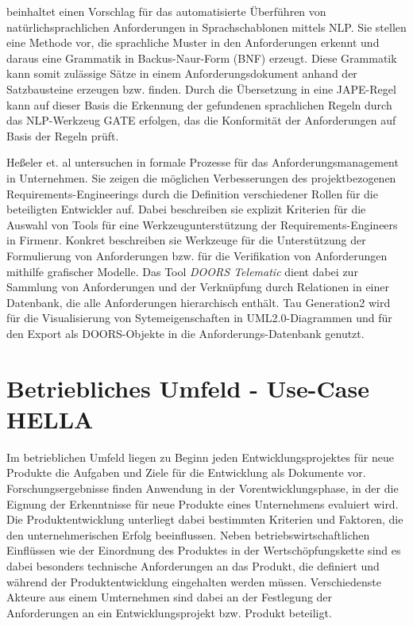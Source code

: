 \documentclass[12pt]{report}
\begin{document}
\vspace{12pt}

\cite{ca15} beinhaltet einen Vorschlag für das automatisierte Überführen von natürlichsprachlichen Anforderungen in Sprachschablonen mittels NLP. Sie stellen eine Methode vor, die sprachliche Muster in den Anforderungen erkennt und daraus eine Grammatik in Backus-Naur-Form (BNF) erzeugt. Diese Grammatik kann somit zulässige Sätze in einem Anforderungsdokument anhand der Satzbausteine erzeugen bzw. finden. Durch die Übersetzung in eine JAPE-Regel kann auf dieser Basis die Erkennung der gefundenen sprachlichen Regeln durch das NLP-Werkzeug GATE erfolgen, das die Konformität der Anforderungen auf Basis der Regeln prüft. 

\vspace{12pt}

Heßeler et. al untersuchen in \cite{he13} formale Prozesse für das Anforderungsmanagement in Unternehmen. Sie zeigen die möglichen Verbesserungen  des projektbezogenen Requirements-Engineerings durch die Definition verschiedener Rollen für die beteiligten Entwickler auf. Dabei beschreiben sie explizit Kriterien für die Auswahl von Tools für eine Werkzeugunterstützung der Requirements-Engineers in Firmenr. Konkret beschreiben sie Werkzeuge für die Unterstützung der Formulierung von Anforderungen bzw. für die Verifikation von Anforderungen mithilfe grafischer Modelle. Das Tool \textit{DOORS Telematic} dient dabei zur Sammlung von Anforderungen und der Verknüpfung durch Relationen in einer Datenbank, die alle Anforderungen hierarchisch enthält. Tau Generation2 wird für die Visualisierung von Sytemeigenschaften in UML2.0-Diagrammen und für den Export als DOORS-Objekte in die Anforderungs-Datenbank genutzt.

\chapter{Betriebliches Umfeld - Use-Case HELLA}
Im betrieblichen Umfeld liegen zu Beginn jeden Entwicklungsprojektes für neue Produkte die Aufgaben und Ziele für die Entwicklung als Dokumente vor. Forschungsergebnisse finden Anwendung in der Vorentwicklungsphase, in der die Eignung der Erkenntnisse für neue Produkte eines Unternehmens evaluiert wird. Die Produktentwicklung unterliegt dabei bestimmten Kriterien und Faktoren, die den unternehmerischen Erfolg beeinflussen. Neben betriebswirtschaftlichen Einflüssen wie der Einordnung des Produktes in der Wertschöpfungskette sind es dabei besonders technische Anforderungen an das Produkt, die definiert und während der Produktentwicklung eingehalten werden müssen. Verschiedenste Akteure aus einem Umternehmen sind dabei an der Festlegung der Anforderungen an ein Entwicklungsprojekt bzw. Produkt beteiligt. 
\end{document}
